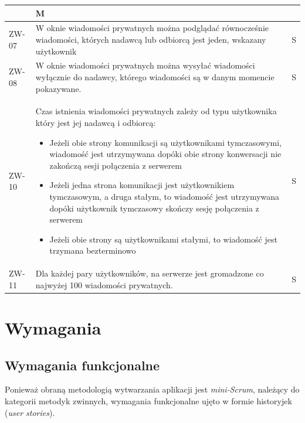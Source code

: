 \documentclass[11pt,oneside,a4paper,titlepage,onecolumn]{article}
\begin{document}
\begin{tabular}{ | l | l | l | }
{    } & M \\
    \hline
    
    \hline
    ZW-07 & \parbox[t]{14cm}{
      W oknie wiadomości prywatnych można podglądać równocześnie
      wiadomości, których nadawcą lub odbiorcą jest jeden, wskazany
      użytkownik
      
    } & S \\
    
    \hline
    ZW-08 & \parbox[t]{14cm}{
      W oknie wiadomości prywatnych można wysyłać wiadomości
      wyłącznie do nadawcy, którego wiadomości są w danym momencie
      pokazywane.
    } & S \\
    
    \hline
    ZW-10 & \parbox[t]{14cm}{
      Czas istnienia wiadomości prywatnych zależy od typu użytkownika
      który jest jej nadawcą i odbiorcą:
      \begin{itemize}
      	\item Jeżeli obie strony komunikacji są użytkownikami
      	tymczasowymi, wiadomość jest utrzymywana dopóki obie
      	strony konwersacji nie zakończą sesji połączenia z serwerem
      	\item Jeżeli jedna strona komunikacji jest użytkownikiem
      	tymczasowym, a druga stałym, to wiadomość jest utrzymywana
      	dopóki użytkownik tymczasowy skończy sesję połączenia z
      	serwerem
      	\item Jeżeli obie strony są użytkownikami stałymi, to
      	wiadomość jest trzymana bezterminowo
      \end{itemize}
    } & S \\
    
    \hline
    ZW-11 & \parbox[t]{14cm}{
      Dla każdej pary użytkowników, na serwerze jest gromadzone co
      najwyżej 100 wiadomości prywatnych.
    } & S \\
    \hline
  \end{tabular}

\section{Wymagania}

\subsection{Wymagania funkcjonalne}

Ponieważ obraną metodologią wytwarzania aplikacji jest \textit{mini-Scrum}, należący do kategorii metodyk zwinnych, wymagania funkcjonalne ujęto w formie historyjek (\textit{user stories}).
\end{document}

